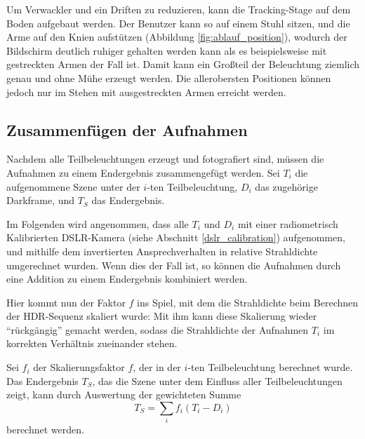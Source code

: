    Um Verwackler und ein Driften zu reduzieren, kann die Tracking-Stage auf dem Boden aufgebaut werden. 
   Der Benutzer kann so auf einem Stuhl sitzen, und die Arme auf den Knien aufstützen (Abbildung \ref{fig:ablauf_position}), wodurch der Bildschirm deutlich ruhiger gehalten werden kann als es beispielsweise mit gestreckten Armen der Fall ist. 
   Damit kann ein Großteil der Beleuchtung ziemlich genau und ohne Mühe erzeugt werden. 
   Die allerobersten Positionen können jedoch nur im Stehen mit ausgestreckten Armen erreicht werden.
 
   
  
 
 
  \subsection{Zusammenfügen der Aufnahmen}
  
    Nachdem alle Teilbeleuchtungen erzeugt und fotografiert sind, müssen die Aufnahmen zu einem Endergebnis zusammengefügt werden.  
    Sei $T_i$ die aufgenommene Szene unter der $i$-ten Teilbeleuchtung, $D_i$ das zugehörige Darkframe, und $T_S$ das Endergebnis.

    Im Folgenden wird angenommen, dass alle $T_i$ und $D_i$ mit einer radiometrisch Kalibrierten DSLR-Kamera (siehe Abschnitt \ref{dslr_calibration}) aufgenommen,  und mithilfe dem invertierten Ansprechverhalten in relative Strahldichte umgerechnet wurden.
    Wenn dies der Fall ist, so können die Aufnahmen durch eine Addition zu einem Endergebnis kombiniert werden.

    Hier kommt nun der Faktor $f$ ins Spiel, mit dem die Strahldichte beim Berechnen der HDR-Sequenz skaliert wurde:
    Mit ihm kann diese Skalierung wieder ``rückgängig'' gemacht werden, sodass die Strahldichte der Aufnahmen $T_i$ im korrekten Verhältnis zueinander stehen.
  
    Sei $f_i$ der Skalierungsfaktor $f$, der in der $i$-ten  Teilbeleuchtung berechnet wurde.
    Das Endergebnis $T_S$, das die Szene unter dem Einfluss aller Teilbeleuchtungen zeigt, kann durch Auswertung der gewichteten Summe 
    \begin{equation}
      T_S =  \sum_i{f_i (T_i-D_i)} 
    \end{equation}
    berechnet werden.
    

